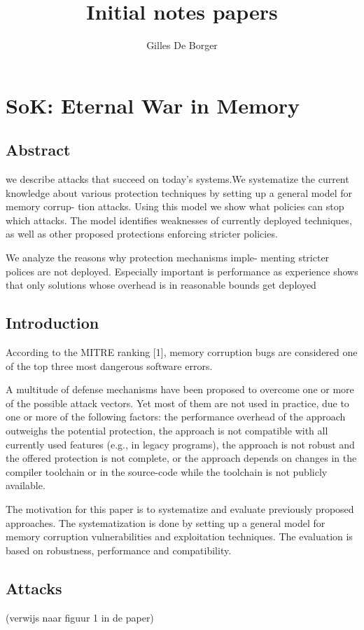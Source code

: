 \documentclass{article}
\title{Initial notes papers}
\author{Gilles De Borger}
\begin{document}
\maketitle

\section{SoK: Eternal War in Memory}
\subsection{Abstract}
we describe attacks that succeed on today’s systems.We
systematize the current knowledge about various protection
techniques by setting up a general model for memory corrup-
tion attacks. Using this model we show what policies can stop
which attacks. The model identifies weaknesses of currently
deployed techniques, as well as other proposed protections
enforcing stricter policies. 

We analyze the reasons why protection mechanisms imple-
menting stricter polices are not deployed. Especially important is performance as experience shows that only
solutions whose overhead is in reasonable bounds get deployed

\subsection{Introduction}
According to the MITRE ranking [1], memory corruption bugs are considered one of the top three most 
dangerous software errors.  

A multitude of defense mechanisms have been proposed
to overcome one or more of the possible attack vectors. Yet
most of them are not used in practice, due to one or more
of the following factors: the performance overhead of the
approach outweighs the potential protection, the approach
is not compatible with all currently used features (e.g., in
legacy programs), the approach is not robust and the offered
protection is not complete, or the approach depends on
changes in the compiler toolchain or in the source-code
while the toolchain is not publicly available.
 
The motivation for this
paper is to systematize and evaluate previously proposed
approaches. The systematization is done by setting up a
general model for memory corruption vulnerabilities and
exploitation techniques. The evaluation is based
on robustness, performance and compatibility.

\subsection{Attacks}
(verwijs naar figuur 1 in de paper) 
\end{document}
